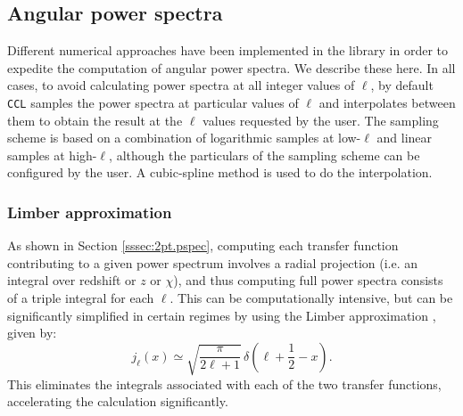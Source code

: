 \documentclass[\docopts]{\docclass}
\newcommand{\ccl}{{\tt CCL}\xspace}
\begin{document}
\subsection{Angular power spectra}

Different numerical approaches have been implemented in the library in order to expedite the computation of angular power spectra. We describe these here. In all cases, to avoid calculating power spectra at all integer values of $\ell$, by default \ccl samples the power spectra at particular values of $\ell$ and interpolates between them to obtain the result at the $\ell$ values requested by the user. The sampling scheme is based on a combination of logarithmic samples at low-$\ell$ and linear samples at high-$\ell$, although the particulars of the sampling scheme can be configured by the user. A cubic-spline method is used to do the interpolation.

\subsubsection{Limber approximation}

As shown in Section \ref{sssec:2pt.pspec}, computing each transfer function contributing to a given power spectrum involves a radial projection (i.e. an integral over redshift or $z$ or $\chi$), and thus computing full power spectra consists of a triple integral for each $\ell$. This can be computationally intensive, but can be significantly simplified in certain regimes by using the Limber approximation \citep{1954ApJ...119..655L,2004PhRvD..69h3524A}, given by:
\begin{equation}
 j_\ell(x)\simeq\sqrt{\frac{\pi}{2\ell+1}}\,\delta\left(\ell+\frac{1}{2}-x\right).
\end{equation}
This eliminates the integrals associated with each of the two transfer functions, accelerating the calculation significantly.
\end{document}

